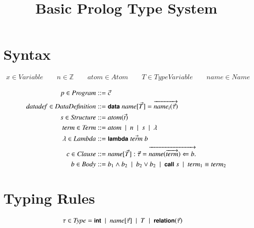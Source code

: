 \documentclass[10pt]{article}
\newcommand{\alt}{\ \mid\ }
\newcommand{\mtt}[1]{\ensuremath{\mathit{#1}}}
\newcommand{\anywhere}[1]{\ensuremath{\mbox{#1}}}
\newcommand{\kw}[1]{\anywhere{\sffamily{\bfseries\small {#1}}}}
\newcommand{\term}{\ensuremath{\mtt{term}}\xspace}
\newcommand{\atom}{\ensuremath{\mtt{atom}}\xspace}
\newcommand{\name}{\ensuremath{\mtt{name}}\xspace}
\newcommand{\datadef}{\ensuremath{\mtt{datadef}}\xspace}
\begin{document}
\title{Basic Prolog Type System}
\author{}
\date{}

\maketitle

\section{Syntax}

\begin{gather*}
  x \in \mtt{Variable} \qquad n \in \mathbb{Z} \qquad \atom \in \mtt{Atom} \qquad T \in \mtt{TypeVariable} \qquad \name \in \mtt{Name}
\end{gather*}

\begin{align*}
  p \in \mtt{Program} &::= \vec{c}
  \\
  \datadef \in \mtt{DataDefinition} &::= \kw{data}\; \name[\vec{T}] = \overrightarrow{\name_i(\vec{\tau})}
  \\
  s \in \mtt{Structure} &::= \atom(\vec{t})
  \\
  \term \in \mtt{Term} &::= \atom \alt n \alt s \alt \lambda
  \\
  \lambda \in \mtt{Lambda} &::= \kw{lambda}\;\vec{\term}\;b
  \\
  c \in \mtt{Clause} &::= \name[\vec{T}] : \vec{\tau} = \overrightarrow{\name(\overrightarrow{\term}) \Leftarrow b.}
  \\
  b \in \mtt{Body} &::= b_1 \land b_2 \alt b_2 \lor b_2
  \alt \kw{call}\;s \alt \term_1 \equiv \term_2
\end{align*}

\section{Typing Rules}
\begin{align*}
  \tau \in \mtt{Type} &= \kw{int} \alt \name[\vec{\tau}] \alt T \alt \kw{relation}(\vec{\tau})
\end{align*}
\end{document}
